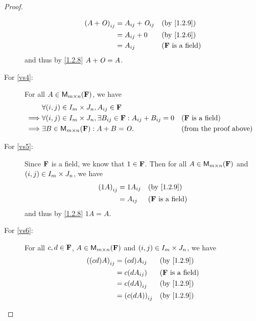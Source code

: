 \begin{proof}
\begin{description}
            \begin{align*}
                \p{A + \zm}_{i j} & = A_{i j} + \zm_{i j} &  & \text{(by \cref{1.2.9})}   \\
                                  & = A_{i j} + 0         &  & \text{(by \cref{1.2.6})}   \\
                                  & = A_{i j}             &  & \text{(\(\F\) is a field)}
            \end{align*}
            and thus by \cref{1.2.8} \(A + \mathit{O} = A\).
        \item[For \ref{vs4}:]
            For all \(A \in {{\mathsf{M}_{{m} \times n}({\mathbf{F}})}}\), we have
            \begin{align*}
                         & \forall \p{i, j} \in I_{m} \times J_{n}, A_{i j} \in \F                                                                    \\
                \implies & \forall \p{i, j} \in I_{m} \times J_{n}, \exists B_{i j} \in \F : A_{i j} + B_{i j} = 0 &  & \text{(\(\F\) is a field)}    \\
                \implies & \exists B \in \MS : A + B = \zm.                                                        &  & \text{(from the proof above)}
            \end{align*}
        \item[For \ref{vs5}:]
            Since \(\mathbf{F}\) is a field, we know that \(1 \in \mathbf{F}\).
            Then for all \(A \in {{\mathsf{M}_{{m} \times n}({\mathbf{F}})}}\) and \(\left\lparen i, j\right\rparen \in I_{m} \times J_{n}\), we have
            \begin{align*}
                \p{1A}_{i j} & = 1 A_{i j} &  & \text{(by \cref{1.2.9})}   \\
                             & = A_{i j}   &  & \text{(\(\F\) is a field)}
            \end{align*}
            and thus by \cref{1.2.8} \(1A = A\).
        \item[For \ref{vs6}:]
            For all \(c, d \in \mathbf{F}\), \(A \in {{\mathsf{M}_{{m} \times n}({\mathbf{F}})}}\) and \(\left\lparen i, j\right\rparen \in I_{m} \times J_{n}\), we have
            \begin{align*}
                \p{\p{cd} A}_{i j} & = \p{cd} A_{i j}      &  & \text{(by \cref{1.2.9})}   \\
                                   & = c \p{d A_{i j}}     &  & \text{(\(\F\) is a field)} \\
                                   & = c \p{d A}_{i j}     &  & \text{(by \cref{1.2.9})}   \\
                                   & = \p{c \p{d A}}_{i j} &  & \text{(by \cref{1.2.9})}

\end{align*}
\end{description}
\end{proof}
